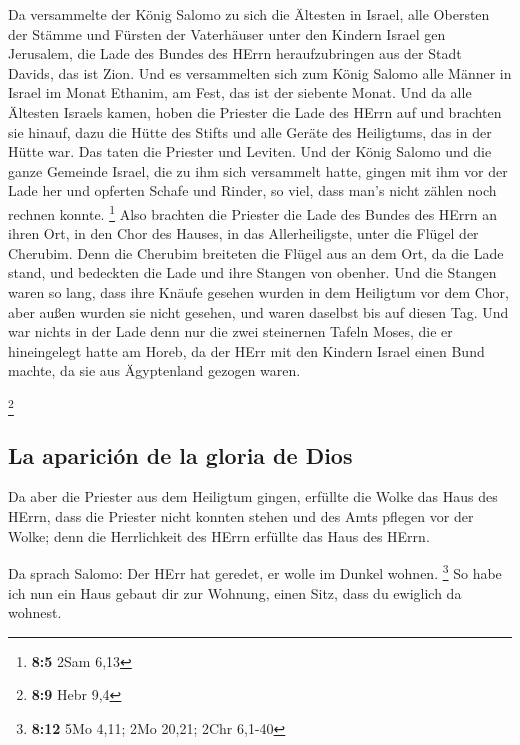  Da versammelte der König Salomo zu sich die Ältesten in
Israel, alle Obersten der Stämme und Fürsten der Vaterhäuser unter den
Kindern Israel gen Jerusalem, die Lade des Bundes des HErrn
heraufzubringen aus der Stadt Davids, das ist Zion.  Und
es versammelten sich zum König Salomo alle Männer in Israel im Monat
Ethanim, am Fest, das ist der siebente Monat.  Und da alle
Ältesten Israels kamen, hoben die Priester die Lade des HErrn auf
 und brachten sie hinauf, dazu die Hütte des Stifts und
alle Geräte des Heiligtums, das in der Hütte war. Das taten die Priester
und Leviten.  Und der König Salomo und die ganze Gemeinde
Israel, die zu ihm sich versammelt hatte, gingen mit ihm vor der Lade
her und opferten Schafe und Rinder, so viel, dass man's nicht zählen
noch rechnen konnte. \footnote{\textbf{8:5} 2Sam 6,13} 
Also brachten die Priester die Lade des Bundes des HErrn an ihren Ort,
in den Chor des Hauses, in das Allerheiligste, unter die Flügel der
Cherubim.  Denn die Cherubim breiteten die Flügel aus an
dem Ort, da die Lade stand, und bedeckten die Lade und ihre Stangen von
obenher.  Und die Stangen waren so lang, dass ihre Knäufe
gesehen wurden in dem Heiligtum vor dem Chor, aber außen wurden sie
nicht gesehen, und waren daselbst bis auf diesen Tag.  Und
war nichts in der Lade denn nur die zwei steinernen Tafeln Moses, die er
hineingelegt hatte am Horeb, da der HErr mit den Kindern Israel einen
Bund machte, da sie aus Ägyptenland gezogen waren.

\footnote{\textbf{8:9} Hebr 9,4}

\hypertarget{la-apariciuxf3n-de-la-gloria-de-dios}{%
\subsection{La aparición de la gloria de
Dios}\label{la-apariciuxf3n-de-la-gloria-de-dios}}

 Da aber die Priester aus dem Heiligtum gingen, erfüllte
die Wolke das Haus des HErrn,  dass die Priester nicht
konnten stehen und des Amts pflegen vor der Wolke; denn die Herrlichkeit
des HErrn erfüllte das Haus des HErrn.

 Da sprach Salomo: Der HErr hat geredet, er wolle im
Dunkel wohnen. \footnote{\textbf{8:12} 5Mo 4,11; 2Mo 20,21; 2Chr 6,1-40}
 So habe ich nun ein Haus gebaut dir zur Wohnung, einen
Sitz, dass du ewiglich da wohnest.

